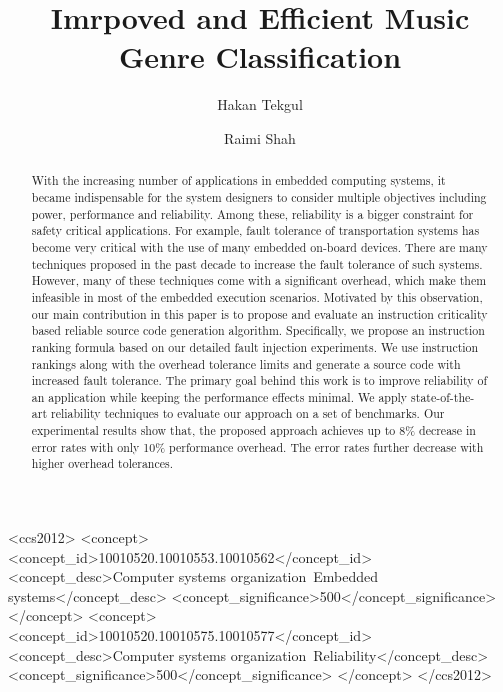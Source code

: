 \documentclass[sigconf]{acmart}
\begin{document}
\title{Imrpoved and Efficient Music Genre Classification}


\author{Hakan Tekgul}
\affiliation
{%
}

\author{Raimi Shah}




\begin{abstract}
With the increasing number of applications in embedded computing systems, it became indispensable for the system designers to consider multiple objectives including power, performance and reliability. Among these, reliability is a bigger constraint for safety critical applications. For example, fault tolerance of transportation systems has become very critical with the use of many embedded on-board devices. There are many techniques proposed in the past decade to increase the fault tolerance of such systems. However, many of these techniques come with a significant overhead, which make them infeasible in most of the embedded execution scenarios. Motivated by this observation, our main contribution in this paper is to propose and evaluate an instruction criticality based reliable source code generation algorithm. Specifically, we propose an instruction ranking formula based on our detailed fault injection experiments. We use instruction rankings along with the overhead tolerance limits and generate a source code with increased fault tolerance. The primary goal behind this work is to improve reliability of an application while keeping the performance effects minimal. We apply state-of-the-art reliability techniques to evaluate our approach on a set of benchmarks. Our experimental results show that, the proposed approach achieves up to 8\% decrease in error rates with only 10\% performance overhead. The error rates further decrease with higher overhead tolerances.
\end{abstract}

%
%

\begin{CCSXML}
<ccs2012>
<concept>
<concept_id>10010520.10010553.10010562</concept_id>
<concept_desc>Computer systems organization~Embedded systems</concept_desc>
<concept_significance>500</concept_significance>
</concept>
<concept>
<concept_id>10010520.10010575.10010577</concept_id>
<concept_desc>Computer systems organization~Reliability</concept_desc>
<concept_significance>500</concept_significance>
</concept>
</ccs2012>
\end{CCSXML}
\end{document}
